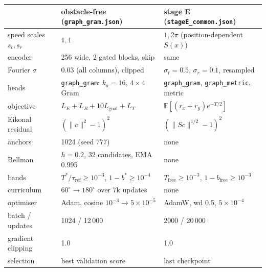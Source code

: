 \documentclass[11pt]{article}
\newcommand{\taur}{\tau_{\mathrm{ref}}}
\newcommand{\code}[1]{\texttt{#1}}
\begin{document}
\begin{center}\small
\begin{tabular}{lll}
\toprule
& obstacle-free (\code{graph\_gram.json}) & stage E (\code{stageE\_common.json})\\
\midrule
speed scales $s_t,s_r$ & $1,1$ & $1,2\pi$ (position-dependent $S(x)$)\\
encoder & 256 wide, 2 gated blocks, skip & same\\
Fourier $\sigma$ & $0.03$ (all columns), clipped & $\sigma_t=0.5$, $\sigma_r=0.1$, resampled\\
heads & \code{graph\_gram}: $k_a=16$, $4\times4$ Gram & \code{graph\_gram}, \code{graph\_metric}, metric\\
objective & $L_E+L_B+10L_{\mathrm{goal}}+L_T$ & $\mathbb E[(r_x+r_y)e^{-T/2}]$\\
Eikonal residual & $(\|c\|^2-1)^2$ & $(\|Sc\|^{1/2}-1)^2$\\
anchors & 1024 (seed 777) & none\\
Bellman & $h=0.2$, 32 candidates, EMA 0.995 & none\\
bands & $T^*/\taur\ge10^{-3}$, $1-b^*\ge10^{-4}$ & $T_{\mathrm{free}}\ge10^{-3}$, $1-b_{\mathrm{free}}\ge10^{-3}$\\
curriculum & $60^\circ\to180^\circ$ over 7k updates & none\\
optimiser & Adam, cosine $10^{-3}\to5\times10^{-5}$ & AdamW, wd 0.5, $5\times10^{-4}$\\
batch / updates & 1024 / 12\,000 & 2000 / 20\,000\\
gradient clipping & 1.0 & 1.0\\
selection & best validation score & last checkpoint\\
\bottomrule
\end{tabular}
\end{center}
\end{document}
